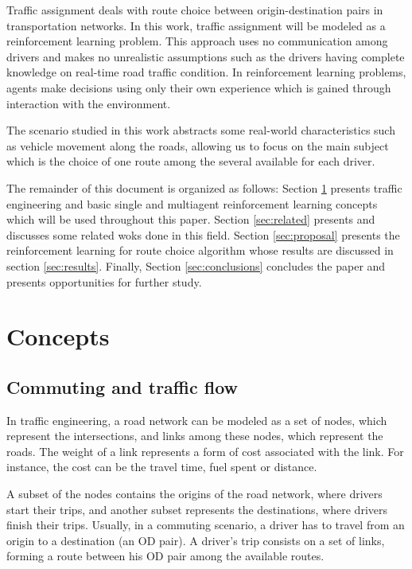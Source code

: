 \documentclass[12pt]{article}
\begin{document}
Traffic assignment deals with route choice between origin-destination pairs in transportation networks. In this work, traffic assignment will be modeled as a reinforcement learning problem. This approach uses no communication among drivers and makes no unrealistic assumptions such as the drivers having complete knowledge on real-time road traffic condition. In reinforcement learning problems, agents make decisions using only their own experience which is gained through interaction with the environment.

The scenario studied in this work abstracts some real-world characteristics such as vehicle movement along the roads, allowing us to focus on the main subject which is the choice of one route among the several available for each driver.

The remainder of this document is organized as follows: Section \ref{sec:concepts} presents traffic engineering and basic single and multiagent reinforcement learning concepts which will be used throughout this paper. Section \ref{sec:related} presents and discusses some related woks done in this field. Section \ref{sec:proposal} presents the reinforcement learning for route choice algorithm whose results are discussed in section \ref{sec:results}. Finally, Section \ref{sec:conclusions} concludes the paper and presents opportunities for further study.

\section{Concepts}
\label{sec:concepts}
\subsection{Commuting and traffic flow}

In traffic engineering, a road network can be modeled as a set of nodes, which represent the intersections, and links among these nodes, which represent the roads. The weight of a link represents a form of cost associated with the link. For instance, the cost can be the travel time, fuel spent or distance.

A subset of the nodes contains the origins of the road network, where drivers start their trips, and another subset represents the destinations, where drivers finish their trips. Usually, in a commuting scenario, a driver has to travel from an origin to a destination (an OD pair). A driver's trip consists on a set of links, forming a route between his OD pair among the available routes.
\end{document}
